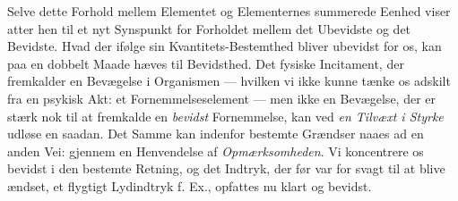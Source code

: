 \documentclass[12pt,a4paper,openany]{book}
\begin{document}
Selve dette Forhold mellem Elementet og Elementernes
summerede Eenhed viser atter hen til et nyt Synspunkt for
Forholdet mellem det Ubevidste og det Bevidste. Hvad der
ifølge sin Kvantitets-Bestemthed bliver ubevidst for os, kan
paa en dobbelt Maade hæves til Bevidsthed. Det fysiske Incitament,
der fremkalder en Bevægelse i Organismen --- hvilken
vi ikke kunne tænke os adskilt fra en psykisk Akt: et Fornemmelseselement
--- men ikke en Bevægelse, der er stærk nok
til at fremkalde en \emph{bevidst} Fornemmelse, kan ved \emph{en
Tilvæxt i Styrke} udløse en saadan. Det Samme kan
indenfor bestemte Grændser naaes ad en anden Vei: gjennem
en Henvendelse af \emph{Opmærksomheden}. Vi koncentrere
os bevidst i den bestemte Retning, og det Indtryk, der
før var for svagt til at blive ændset, et flygtigt Lydindtryk
f. Ex., opfattes nu klart og bevidst.
\end{document}
